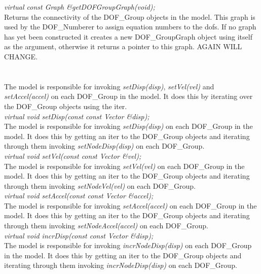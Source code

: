 {\em virtual const Graph \&getDOFGroupGraph(void);} \\
Returns the connectivity of the DOF\_Group objects in the model. 
This graph is used by the DOF\_Numberer to assign equation numbers to
the dofs. If no graph has yet been constructed it creates
a new DOF\_GroupGraph object using itself as the argument, otherwise it
returns a pointer to this graph. AGAIN WILL CHANGE.\\

  \\
\\ 
The model is responsible for invoking {\em setDisp(disp)}, {\em
setVel(vel)} and {\em setAccel(accel)} on each DOF\_Group in the
model. It does this by iterating over the DOF\_Group objects using the
iter. \\

{\em virtual void setDisp(const const Vector \&disp);} \\
The model is responsible for invoking {\em setDisp(disp)} on each
DOF\_Group in the model. It does this by getting an iter to the
DOF\_Group objects and iterating through them invoking {\em
setNodeDisp(disp)} on each DOF\_Group. \\

{\em virtual void setVel(const const Vector \&vel);} \\
The model is responsible for invoking {\em setVel(vel)} on each
DOF\_Group in the model. It does this by getting an iter to the
DOF\_Group objects and iterating through them invoking {\em
setNodeVel(vel)} on each DOF\_Group. \\


{\em virtual void setAccel(const const Vector \&accel);} \\
The model is responsible for invoking {\em setAccel(accel)} on each
DOF\_Group in the model. It does this by getting an iter to the
DOF\_Group objects and iterating through them invoking {\em
setNodeAccel(accel)} on each DOF\_Group. \\

{\em virtual void incrDisp(const const Vector \&disp);} \\
The model is responsible for invoking {\em incrNodeDisp(disp)} on each
DOF\_Group in the model. It does this by getting an iter to the
DOF\_Group objects and iterating through them invoking {\em
incrNodeDisp(disp)} on each DOF\_Group. \\


